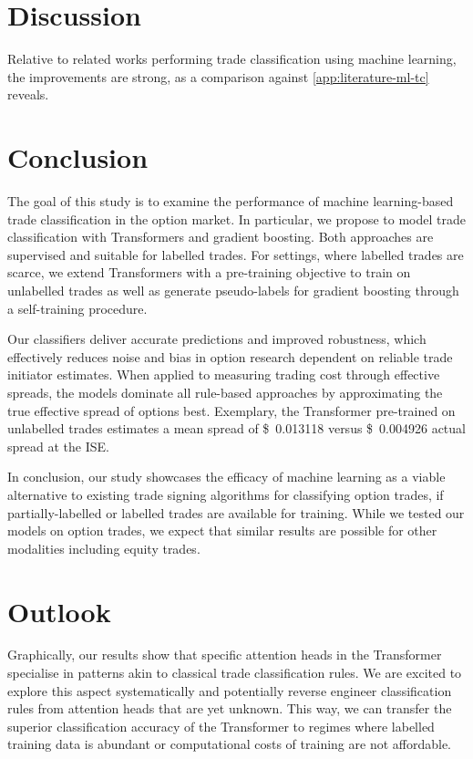 \section{Discussion}\label{sec:discussion}

Relative to related works performing trade classification using machine learning, the improvements are strong, as a comparison against \cref{app:literature-ml-tc} reveals.

\newpage
\section{Conclusion}\label{sec:conclusion}

The goal of this study is to examine the performance of machine learning-based trade classification in the option market. In particular, we propose to model trade classification with Transformers and gradient boosting. Both approaches are supervised and suitable for labelled trades. For settings, where labelled trades are scarce, we extend Transformers with a pre-training objective to train on unlabelled trades as well as generate pseudo-labels for gradient boosting through a self-training procedure.

Our classifiers deliver accurate predictions and improved robustness, which effectively reduces noise and bias in option research dependent on reliable trade initiator estimates. When applied to measuring trading cost through effective spreads, the models dominate all rule-based approaches by approximating the true effective spread of options best. Exemplary, the Transformer pre-trained on unlabelled trades estimates a mean spread of  \SI[round-mode=places, round-precision=3]{0.013118}[\$]{} versus \SI[round-mode=places, round-precision=3]{0.004926}[\$]{} actual spread at the \gls{ISE}.

In conclusion, our study showcases the efficacy of machine learning as a viable alternative to existing trade signing algorithms for classifying option trades, if partially-labelled or labelled trades are available for training. While we tested our models on option trades, we expect that similar results are possible for other modalities including equity trades. 

\newpage
\section{Outlook}\label{sec:outlook}

Graphically, our results show that specific attention heads in the Transformer specialise in patterns akin to classical trade classification rules. We are excited to explore this aspect systematically and potentially reverse engineer classification rules from attention heads that are yet unknown. This way, we can transfer the superior classification accuracy of the Transformer to regimes where labelled training data is abundant or computational costs of training are not affordable.